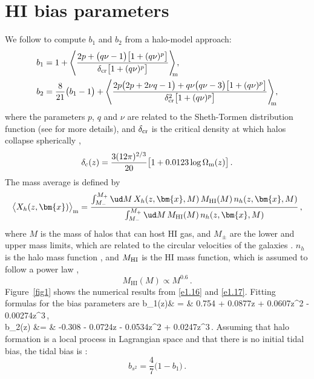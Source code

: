 \section{HI bias parameters} \label{app1}

We follow \cite{Umeh:2015gza} to compute $b_{1}$ and $b_{2}$ from a halo-model approach:
\begin{align}
b_{1} &= 1 + \left\langle \frac{2p+\big(q\nu - 1\big)\big[1+(q\nu)^{p}\big]}{\delta_{\rm cr}\big[1+(q\nu)^{p}\big]} \right\rangle _{\!\!\!\rm m}  \!\!, \label{e1.16} \\
b_{2} &= \frac{8}{21}\big(b_{1}-1\big) + \left \langle \frac{2p\big(2p+2\nu q-1\big)+ q\nu\big(q\nu-3\big)\big[1+(q\nu)^{p}\big]}{\delta_{\rm cr}^{2}\big[1+(q\nu)^{p}\big]}  \right \rangle _{\!\!\!\rm m}  \!\!, \label{e1.17}
\end{align}
where the parameters $p$, $q$ and $\nu$ are related to the Sheth-Tormen distribution function (see \cite{Sheth:1999su, Sheth:2001dp, Sheth:1999mn} for more details), and $\delta_{\rm cr}$ is the critical density at which halos collapse spherically \cite{Kitayama:1996ne}, 
\begin{equation}
\delta_{\rm c}(z) = \frac{3(12\pi)^{2/3}}{20}\big[1+0.0123\log{\Omega_{\rm m} (z)}\big] \,. \label{e1.20}
\end{equation}
The mass average is defined by 
\begin{equation}
\big\langle X_{h}(z,\bm{x}) \big\rangle _{\rm m}  = \frac{\int_{M_{-}}^{M_{+}} \ud M\,X_{h}(z,\bm{x},M)\,M_{\mathrm{HI}}(M)\,n_{h}(z,\bm{x},M)}{\int_{M_{-}}^{M_{+}} \ud M\,M_{\mathrm{HI}}(M)\,n_{h}(z,\bm{x},M)} \, , \label{e1.18}
\end{equation}
where $M$ is the mass of {halos} that can host HI gas, and $M_{\pm}$ are the lower and upper mass limits, which are  related to the circular velocities  of the galaxies \citep{Bull:2014rha}. $n_{h}$ is the halo mass function \citep{Sheth:1999su, Sheth:2001dp,Tellarini:2015faa}, and $M_{\rm HI}$ is the HI mass function, which is assumed to follow a power law  \citep{Santos:2015gra},
\begin{equation}
M_{\mathrm{HI}}(M) \propto M^{0.6} \,. \label{e1.19}
\end{equation}
 Figure~\ref{fig1} shows the numerical results from \eqref{e1.16} and \eqref{e1.17}. Fitting formulas for the bias parameters are
\bea
b_{1}(z)& = & 0.754 + 0.0877z + 0.0607z^{2} - 0.00274z^{3}\,, \label{e1.27} \\
b_{2}(z) &= & -0.308 - 0.0724z - 0.0534z^{2} + 0.0247z^{3}\,. \label{e1.28}
\eea
Assuming that  halo formation is a local process in Lagrangian space and that there is no initial tidal bias, the tidal bias is \cite{Tellarini:2015faa}:
\begin{equation}
b_{s^{2}} = \frac{4}{7}\big(1-b_{1}\big)\,.\label{e1.21} 
\end{equation} 


